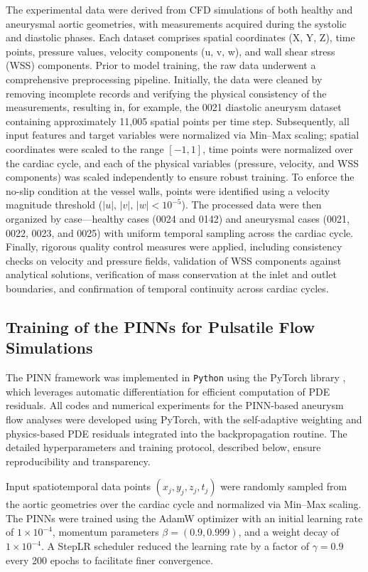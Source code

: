 \documentclass[12pt, a4paper]{article}
\begin{document}
The experimental data were derived from CFD simulations of both healthy and aneurysmal aortic geometries, with measurements acquired during the systolic and diastolic phases. Each dataset comprises spatial coordinates (X, Y, Z), time points, pressure values, velocity components (u, v, w), and wall shear stress (WSS) components. Prior to model training, the raw data underwent a comprehensive preprocessing pipeline. Initially, the data were cleaned by removing incomplete records and verifying the physical consistency of the measurements, resulting in, for example, the 0021 diastolic aneurysm dataset containing approximately 11,005 spatial points per time step. Subsequently, all input features and target variables were normalized via Min–Max scaling; spatial coordinates were scaled to the range \([-1,1]\), time points were normalized over the cardiac cycle, and each of the physical variables (pressure, velocity, and WSS components) was scaled independently to ensure robust training. To enforce the no-slip condition at the vessel walls, points were identified using a velocity magnitude threshold (\(|u|,\, |v|,\, |w| < 10^{-5}\)). The processed data were then organized by case—healthy cases (0024 and 0142) and aneurysmal cases (0021, 0022, 0023, and 0025) with uniform temporal sampling across the cardiac cycle. Finally, rigorous quality control measures were applied, including consistency checks on velocity and pressure fields, validation of WSS components against analytical solutions, verification of mass conservation at the inlet and outlet boundaries, and confirmation of temporal continuity across cardiac cycles.

\subsection{Training of the PINNs for Pulsatile Flow Simulations}
\label{sec:training_PINNs}

The PINN framework was implemented in \texttt{Python} using the PyTorch library \citep{paszke2019pytorch}, which leverages automatic differentiation for efficient computation of PDE residuals. All codes and numerical experiments for the PINN-based aneurysm flow analyses were developed using PyTorch, with the self-adaptive weighting and physics-based PDE residuals integrated into the backpropagation routine. The detailed hyperparameters and training protocol, described below, ensure reproducibility and transparency.

Input spatiotemporal data points \((x_j, y_j, z_j, t_j)\) were randomly sampled from the aortic geometries over the cardiac cycle and normalized via Min–Max scaling. The PINNs were trained using the AdamW optimizer \citep{loshchilov2017decoupled} with an initial learning rate of \(1\times10^{-4}\), momentum parameters \(\beta = (0.9,0.999)\), and a weight decay of \(1\times10^{-4}\). A StepLR scheduler reduced the learning rate by a factor of \(\gamma=0.9\) every 200 epochs to facilitate finer convergence.
\end{document}
